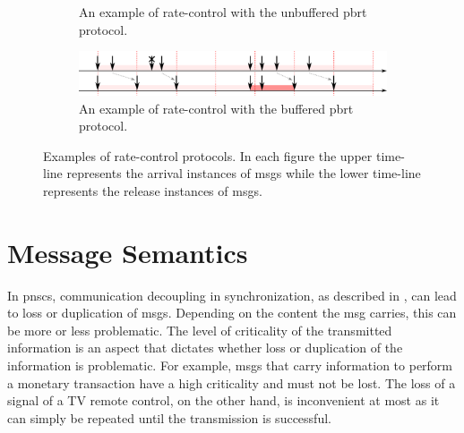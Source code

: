 \begin{figure}[bht]
\begin{subfigure}[h]{\linewidth}
        \CaptionFigSpace
        \caption{An example of rate-control with the unbuffered \gls{pbrt} protocol.}
        \label{fig_rate_ctl_pbrt}
        \vspace{1em}
    \end{subfigure}
    \begin{subfigure}[h]{\linewidth}
        \centering
        \includegraphics[width=12cm]{fig/rate_control_bpbrt.pdf}
        \CaptionFigSpace
        \caption{An example of rate-control with the buffered \gls{pbrt} protocol.}
        \label{fig_rate_ctl_bpbrt}
    \end{subfigure}
\caption{Examples of rate-control protocols.
In each figure the upper time-line represents the arrival instances of \glspl*{msg} while the lower time-line represents the release instances of \glspl*{msg}.}
    \label{fig_rate_ctl}
    \BotFigSpace
\end{figure}

\section{Message Semantics}
\label{sect_tcm_msg}
In \glspl{pnsc}, communication decoupling in synchronization, as described in \Sect{\ref{sect_cci_decoupling_sync}}, can lead to loss or duplication of \glspl*{msg}.
Depending on the content the \gls*{msg} carries, this can be more or less problematic.
The level of criticality of the transmitted information is an aspect that dictates whether loss or duplication of the information is problematic.
For example, \glspl*{msg} that carry information to perform a monetary transaction have a high criticality and must not be lost.
The loss of a signal of a TV remote control, on the other hand, is inconvenient at most as it can simply be repeated until the transmission is successful.

